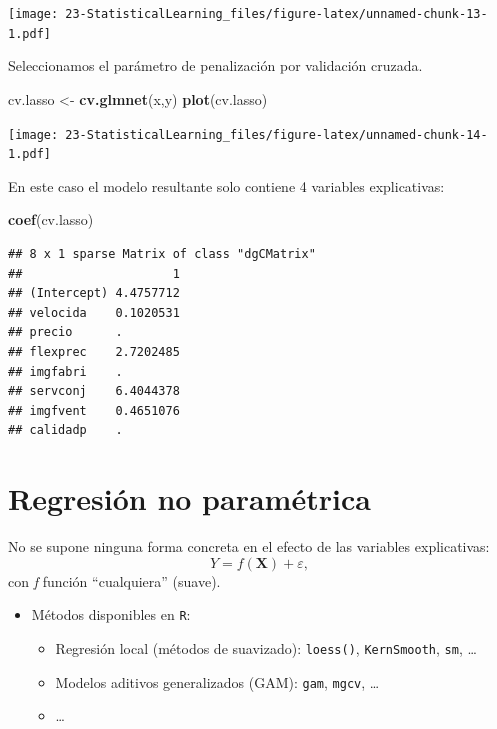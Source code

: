 \documentclass[]{book}
\newenvironment{Shaded}{\begin{snugshade}}{\end{snugshade}}
\newcommand{\KeywordTok}[1]{\textcolor[rgb]{0.13,0.29,0.53}{\textbf{#1}}}
\newcommand{\StringTok}[1]{\textcolor[rgb]{0.31,0.60,0.02}{#1}}
\newcommand{\NormalTok}[1]{#1}
\begin{document}
\texttt{[image: 23-StatisticalLearning\_files/figure-latex/unnamed-chunk-13-1.pdf]}

Seleccionamos el parámetro de penalización por validación cruzada.

\begin{Shaded}
\begin{Highlighting}[]
\NormalTok{cv.lasso <-}\StringTok{ }\KeywordTok{cv.glmnet}\NormalTok{(x,y)}
\KeywordTok{plot}\NormalTok{(cv.lasso)}
\end{Highlighting}
\end{Shaded}

\texttt{[image: 23-StatisticalLearning\_files/figure-latex/unnamed-chunk-14-1.pdf]}

En este caso el modelo resultante solo contiene 4 variables
explicativas:

\begin{Shaded}
\begin{Highlighting}[]
\KeywordTok{coef}\NormalTok{(cv.lasso)}
\end{Highlighting}
\end{Shaded}

\begin{verbatim}
## 8 x 1 sparse Matrix of class "dgCMatrix"
##                     1
## (Intercept) 4.4757712
## velocida    0.1020531
## precio      .        
## flexprec    2.7202485
## imgfabri    .        
## servconj    6.4044378
## imgfvent    0.4651076
## calidadp    .
\end{verbatim}

\section{Regresión no paramétrica}\label{regresiuxf3n-no-paramuxe9trica}

No se supone ninguna forma concreta en el efecto de las variables
explicativas: \[Y=f\left(  \mathbf{X}\right)  +\varepsilon,\] con
\emph{f} función ``cualquiera'' (suave).

\begin{itemize}
\item
  Métodos disponibles en \texttt{R}:

  \begin{itemize}
  \item
    Regresión local (métodos de suavizado): \texttt{loess()},
    \texttt{KernSmooth}, \texttt{sm}, \ldots{}
  \item
    Modelos aditivos generalizados (GAM): \texttt{gam}, \texttt{mgcv},
    \ldots{}
  \item
    \ldots{}
  \end{itemize}
\end{itemize}
\end{document}
